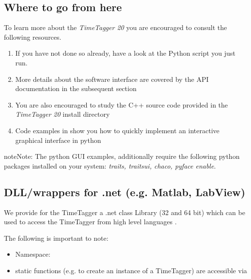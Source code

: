 \documentclass[letterpaper,10pt,english]{sphinxmanual}
\begin{document}
\subsection{Where to go from here}
\label{sections/gettingStarted:where-to-go-from-here}
To learn more about the \emph{TimeTagger 20} you are encouraged to consult the following resources.
\begin{enumerate}
\item {} 
If you have not done so already, have a look at the Python script you just run.

\item {} 
More details about the software interface are covered by the API documentation in the subsequent section

\item {} 
You are also encouraged to study the C++ source code provided in the \emph{TimeTagger 20} install directory

\item {} 
Code examples in  show you how to quickly implement an interactive graphical interface in python

\end{enumerate}

\begin{notice}{note}{Note:}
The python GUI examples, additionally require the following python packages installed on your system: \emph{traits, traitsui, chaco, pyface enable}.
\end{notice}


\subsection{DLL/wrappers for .net (e.g. Matlab, LabView)}
\label{sections/gettingStarted:dll-wrappers-for-net-e-g-matlab-labview}
We provide for the TimeTagger a .net class Library (32 and 64 bit) which can be used to access the TimeTagger from high level languages .

The following is important to note:
\begin{itemize}
\item {} 
Namespace: 

\item {} 
static functions (e.g. to create an instance of a TimeTagger) are accessible via 

\end{itemize}
\end{document}
